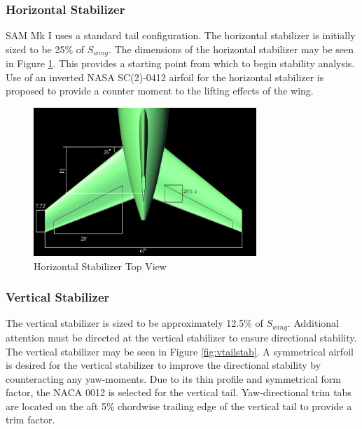 \subsubsection{Horizontal Stabilizer}
SAM Mk I uses a standard tail configuration.  The horizontal stabilizer is initially sized to be 25\% of $S_{wing}$.  The dimensions of the horizontal stabilizer may be seen in Figure \ref{fig:htailstab}.  This provides a starting point from which to begin stability analysis.  Use of an inverted NASA SC(2)-0412 airfoil for the horizontal stabilizer is proposed to provide a counter moment to the lifting effects of the wing.
\begin{figure}[!h]
    \centering
    \includegraphics[width=0.75\textwidth]{Photos/stab/htail.jpg}
    \caption{Horizontal Stabilizer Top View}
    \label{fig:htailstab}
\end{figure}

\subsubsection{Vertical Stabilizer}
The vertical stabilizer is sized to be approximately 12.5\% of $S_{wing}$.  Additional attention must be directed at the vertical stabilizer to ensure directional stability.  The vertical stabilizer may be seen in Figure \ref{fig:vtailstab}.  A symmetrical airfoil is desired for the vertical stabilizer to improve the directional stability by counteracting any yaw-moments.  Due to its thin profile and symmetrical form factor, the NACA 0012 is selected for the vertical tail.  Yaw-directional trim tabs are located on the aft 5\% chordwise trailing edge of the vertical tail to provide a trim factor.


